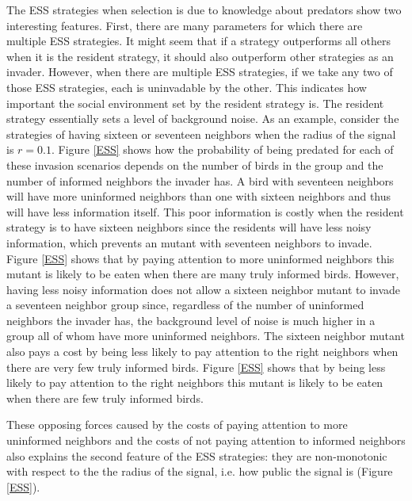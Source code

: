 \documentclass{article}
\begin{document}
The ESS strategies when selection is due to knowledge about predators show two interesting features. First, there are many parameters for which there are multiple ESS strategies. It might seem that if a strategy outperforms all others when it is the resident strategy, it should also outperform other strategies as an invader. However, when there are multiple ESS strategies, if we take any two of those ESS strategies, each is uninvadable by the other. This indicates how important the social environment set by the resident strategy is. The resident strategy essentially sets a level of background noise. As an example, consider the strategies of having sixteen or seventeen neighbors when the radius of the signal is $r=0.1$. Figure \ref{ESS} shows how the probability of being predated for each of these invasion scenarios depends on the number of birds in the group and the number of informed neighbors the invader has.  A bird with seventeen neighbors will have more uninformed neighbors than one with sixteen neighbors and thus will have less information itself. This poor information is  costly when the resident strategy is to have sixteen neighbors since the residents will have less noisy information, which prevents an mutant with seventeen neighbors to invade. Figure \ref{ESS} shows that by paying attention to more uninformed neighbors this mutant is likely to be eaten when there are many truly informed birds. However, having less noisy information does not allow a sixteen neighbor mutant to invade a seventeen neighbor group since, regardless of the number of uninformed neighbors the invader has, the background level of noise is much higher in a group all of whom have more uninformed neighbors. The sixteen neighbor mutant also pays a cost by being less likely to pay attention to the right neighbors when there are very few truly informed birds.  Figure \ref{ESS} shows that by being less likely to pay attention to the right neighbors this mutant is likely to be eaten when there are few truly informed birds.

These opposing forces caused by the costs of paying attention to more uninformed neighbors and the costs of not paying attention to informed neighbors also explains the second feature of the ESS strategies: they are non-monotonic with respect to the the radius of the signal, i.e. how public the signal is (Figure \ref{ESS}).
\end{document}
